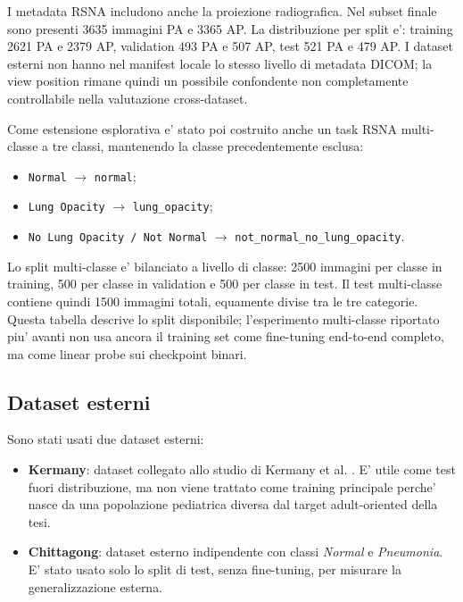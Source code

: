 \documentclass[11pt,a4paper]{article}
\newcommand{\normal}{\textit{Normal}}
\newcommand{\pneumonia}{\textit{Pneumonia}}
\begin{document}
I metadata RSNA includono anche la proiezione radiografica. Nel subset finale
sono presenti 3635 immagini PA e 3365 AP. La distribuzione per split e':
training 2621 PA e 2379 AP, validation 493 PA e 507 AP, test 521 PA e 479 AP.
I dataset esterni non hanno nel manifest locale lo stesso livello di metadata
DICOM; la view position rimane quindi un possibile confondente non completamente
controllabile nella valutazione cross-dataset.

Come estensione esplorativa e' stato poi costruito anche un task RSNA
multi-classe a tre classi, mantenendo la classe precedentemente esclusa:

\begin{itemize}
  \item \texttt{Normal} $\rightarrow$ \texttt{normal};
  \item \texttt{Lung Opacity} $\rightarrow$ \texttt{lung\_opacity};
  \item \texttt{No Lung Opacity / Not Normal} $\rightarrow$
  \texttt{not\_normal\_no\_lung\_opacity}.
\end{itemize}

Lo split multi-classe e' bilanciato a livello di classe: 2500 immagini per
classe in training, 500 per classe in validation e 500 per classe in test. Il
test multi-classe contiene quindi 1500 immagini totali, equamente divise tra le
tre categorie. Questa tabella descrive lo split disponibile; l'esperimento
multi-classe riportato piu' avanti non usa ancora il training set come
fine-tuning end-to-end completo, ma come linear probe sui checkpoint binari.

\subsection{Dataset esterni}

Sono stati usati due dataset esterni:

\begin{itemize}
  \item \textbf{Kermany}: dataset collegato allo studio di Kermany et al.
  \cite{kermany2018}. E' utile come test fuori distribuzione, ma non viene
  trattato come training principale perche' nasce da una popolazione pediatrica
  diversa dal target adult-oriented della tesi.
  \item \textbf{Chittagong}: dataset esterno indipendente con classi
  \normal{} e \pneumonia. E' stato usato solo lo split di test, senza
  fine-tuning, per misurare la generalizzazione esterna.
\end{itemize}
\end{document}
